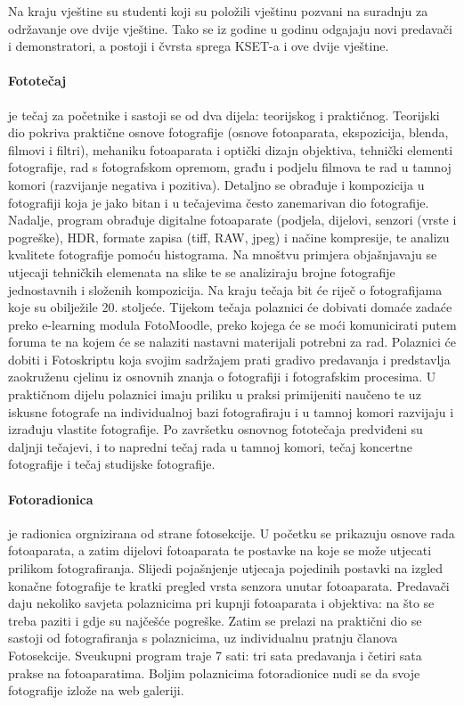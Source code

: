 \documentclass[12pt,a4paper,oneside]{article}
\begin{document}
Na kraju vještine su studenti koji su položili vještinu pozvani na suradnju za održavanje ove dvije vještine. Tako se iz godine u godinu odgajaju novi predavači i demonstratori, a postoji i čvrsta sprega KSET-a i ove dvije vještine.
	

	\paragraph{Fototečaj}je tečaj za početnike i sastoji se od dva dijela: teorijskog i praktičnog. Teorijski dio  pokriva praktične osnove fotografije (osnove fotoaparata, ekspozicija, blenda, filmovi i filtri), mehaniku  fotoaparata i optički dizajn objektiva, tehnički elementi fotografije, rad s fotografskom opremom, građu i podjelu filmova te rad u tamnoj komori (razvijanje negativa i pozitiva). Detaljno se obrađuje i kompozicija u fotografiji  koja je jako bitan i u tečajevima često zanemarivan dio fotografije. Nadalje, program obrađuje digitalne fotoaparate (podjela, dijelovi, senzori  (vrste i pogreške), HDR, formate zapisa (tiff, RAW, jpeg) i načine kompresije, te analizu kvalitete fotografije pomoću histograma. Na mnoštvu primjera objašnjavaju se utjecaji tehničkih elemenata na slike te se analiziraju brojne fotografije jednostavnih i složenih kompozicija. Na kraju tečaja bit će riječ o fotografijama koje su obilježile 20. stoljeće. Tijekom tečaja polaznici će dobivati domaće zadaće preko e-learning modula FotoMoodle, preko kojega će se moći komunicirati putem foruma te na kojem će se nalaziti nastavni materijali potrebni za rad. Polaznici će dobiti i Fotoskriptu koja svojim sadržajem prati gradivo predavanja i predstavlja zaokruženu cjelinu iz osnovnih znanja o fotografiji i fotografskim procesima. U praktičnom dijelu polaznici imaju priliku u praksi primijeniti naučeno te uz iskusne fotografe na individualnoj bazi fotografiraju i u tamnoj komori razvijaju i izrađuju vlastite fotografije. Po završetku osnovnog fototečaja predviđeni su daljnji tečajevi, i to napredni tečaj rada u tamnoj komori, tečaj koncertne fotografije i tečaj studijske fotografije.
	
	\paragraph{Fotoradionica}je radionica orgnizirana od strane fotosekcije. U početku se prikazuju osnove rada fotoaparata, a zatim dijelovi fotoaparata te postavke na koje se može utjecati prilikom fotografiranja. Slijedi pojašnjenje utjecaja pojedinih postavki na izgled konačne fotografije te kratki pregled vrsta senzora unutar fotoaparata. Predavači daju nekoliko savjeta polaznicima pri kupnji fotoaparata i objektiva: na što se treba paziti i gdje su najčešće pogreške. Zatim se prelazi na praktični dio se sastoji od fotografiranja s polaznicima, uz individualnu pratnju članova Fotosekcije. Sveukupni program traje 7 sati: tri sata predavanja i četiri sata prakse na fotoaparatima. Boljim polaznicima fotoradionice nudi se da svoje fotografije izlože na web galeriji.
	
\end{document}
